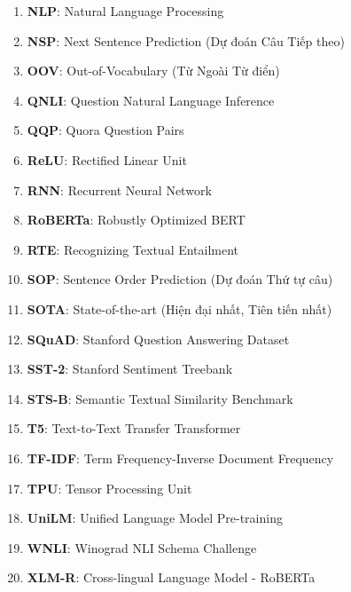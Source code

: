 \begin{enumerate}[label=--, wide, labelindent=0pt]
    \item \textbf{NLP}: Natural Language Processing \label{acro:nlp}
    \item \textbf{NSP}: Next Sentence Prediction (Dự đoán Câu Tiếp theo) \label{acro:nsp}
    \item \textbf{OOV}: Out-of-Vocabulary (Từ Ngoài Từ điển) \label{acro:oov}
    \item \textbf{QNLI}: Question Natural Language Inference \label{acro:qnli}
    \item \textbf{QQP}: Quora Question Pairs \label{acro:qqp}
    \item \textbf{ReLU}: Rectified Linear Unit \label{acro:relu}
    \item \textbf{RNN}: Recurrent Neural Network \label{acro:rnn}
    \item \textbf{RoBERTa}: Robustly Optimized BERT \label{acro:roberta}
    \item \textbf{RTE}: Recognizing Textual Entailment \label{acro:rte}
    \item \textbf{SOP}: Sentence Order Prediction (Dự đoán Thứ tự câu) \label{acro:sop}
    \item \textbf{SOTA}: State-of-the-art (Hiện đại nhất, Tiên tiến nhất) \label{acro:sota}
    \item \textbf{SQuAD}: Stanford Question Answering Dataset \label{acro:squad}
    \item \textbf{SST-2}: Stanford Sentiment Treebank \label{acro:sst2}
    \item \textbf{STS-B}: Semantic Textual Similarity Benchmark \label{acro:stsb}
    \item \textbf{T5}: Text-to-Text Transfer Transformer \label{acro:t5}
    \item \textbf{TF-IDF}: Term Frequency-Inverse Document Frequency \label{acro:tfidf}
    \item \textbf{TPU}: Tensor Processing Unit \label{acro:tpu}
    \item \textbf{UniLM}: Unified Language Model Pre-training \label{acro:unilm}
    \item \textbf{WNLI}: Winograd NLI Schema Challenge \label{acro:wnli}
    \item \textbf{XLM-R}: Cross-lingual Language Model - RoBERTa \label{acro:xlm-r}
\end{enumerate}
\newpage